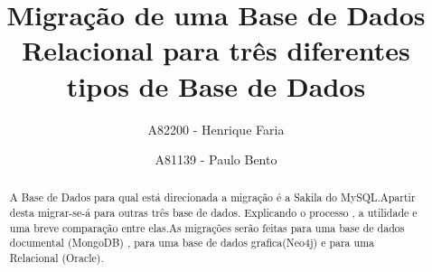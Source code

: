 

\title{Migração de uma Base de Dados Relacional para três diferentes tipos de Base de Dados}

\author{A82200 - Henrique Faria \and A81139 - Paulo Bento}




\maketitle

\begin{abstract}

A Base de Dados para qual está direcionada a migração é a Sakila do MySQL.Apartir desta migrar-se-á para outras três base de dados. Explicando o processo , a utilidade e uma breve comparação entre elas.As migrações serão feitas para uma base de dados documental (MongoDB) , para uma base de dados grafica(Neo4j) e para uma Relacional (Oracle).

\end{abstract}
\newpage

